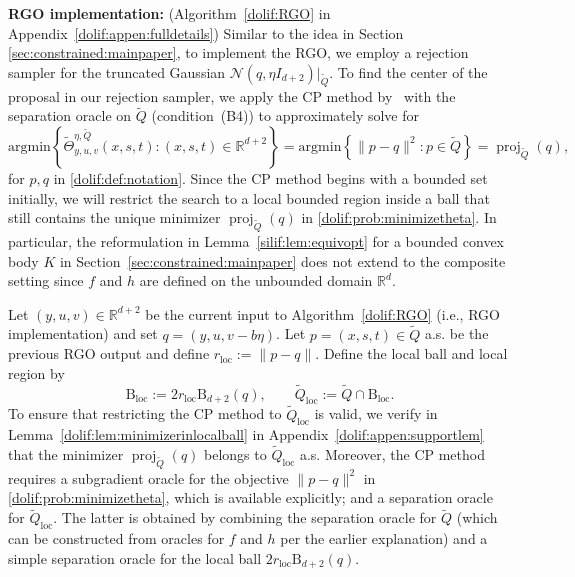 \documentclass[11pt,letterpaper]{article}
\newcommand{\ball}{\mathrm{B}}
\newcommand{\R}{\mathbb{R}}
\newcommand{\local}{\mathrm{loc}}
\newcommand{\Q}{\widetilde{Q}}
\newcommand{\proj}{\operatorname{proj}}
\newcommand{\argmin}{\mathrm{argmin}  }
\newcommand{\brac}[1]{\left( #1\right)}
\begin{document}
\textbf{RGO implementation:} (Algorithm~\ref{dolif:RGO} in Appendix~\ref{dolif:appen:fulldetails}) Similar to the idea in Section \ref{sec:constrained:mainpaper}, to implement the RGO, we employ a rejection sampler for the truncated Gaussian $\mathcal{N}\brac{q,\eta I_{d+2}}|_{\Q}$. To find the center of the proposal in our rejection sampler, we apply the CP method by~\cite{jiang2020cuttingplane} with the separation oracle on $\Q$ (condition~(B4)) to approximately solve for 
\begin{equation}
\label{dolif:prob:minimizetheta}
    \argmin\left\{\widetilde{\Theta}^{\eta,\Q}_{y,u,v}(x,s,t): (x,s,t)\in\R^{d+2}\right\} =\argmin \left\{\|p-q\|^2: p\in\Q\right\} =\proj_{\Q}(q),
\end{equation} 
for $p, q$ in \eqref{dolif:def:notation}. Since the CP method begins with a bounded set initially, we will restrict the search to a local bounded region inside a ball that still contains the unique minimizer $\proj_{\Q}(q)$ in \eqref{dolif:prob:minimizetheta}. In particular, the reformulation in Lemma~\ref{silif:lem:equivopt} for a bounded convex body $K$ in Section~\ref{sec:constrained:mainpaper} does not extend to the composite setting since $f$ and $h$ are defined on the unbounded domain $\R^d$.


Let $(y,u,v)\in\R^{d+2}$ be the current input to Algorithm~\ref{dolif:RGO} (i.e., RGO implementation) and set $q=(y,u,v-b\eta)$. Let $p=(x,s,t)\in\Q$ a.s. be the previous RGO output and define $r_{\local}:=\|p-q\|$. Define the local ball and local region by
\begin{equation}
\label{dolif:def:localball}
    \ball_{\local}:=2r_{\local}\ball_{d+2}(q), \qquad  \Q_{\local}:=\Q\cap \ball_{\local}.
\end{equation}
To ensure that restricting the CP method to $\Q_{\local}$  is valid, we verify in Lemma~\ref{dolif:lem:minimizerinlocalball} in Appendix~\ref{dolif:appen:supportlem} that the minimizer $\proj_{\Q}(q)$
belongs to $\Q_{\local}$ a.s. Moreover,  the CP method requires a subgradient oracle for the objective $\|p-q\|^2$ in \eqref{dolif:prob:minimizetheta}, which is available explicitly; and a separation oracle for $\Q_{\local}$. The latter is obtained by combining the separation oracle for $\Q$ (which can be constructed from oracles for $f$ and $h$ per the earlier explanation) and a simple separation oracle for the local ball $2r_{\local}\ball_{d+2}(q)$. 



\end{document}
